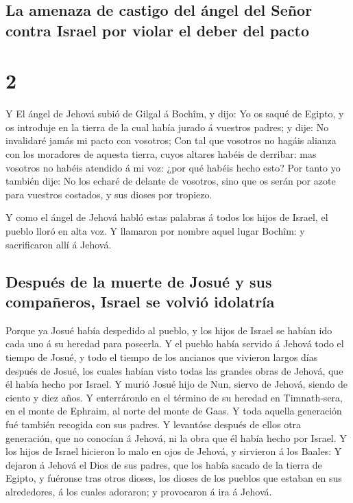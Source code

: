 \hypertarget{la-amenaza-de-castigo-del-uxe1ngel-del-seuxf1or-contra-israel-por-violar-el-deber-del-pacto}{%
\subsection{La amenaza de castigo del ángel del Señor contra Israel por
violar el deber del
pacto}\label{la-amenaza-de-castigo-del-uxe1ngel-del-seuxf1or-contra-israel-por-violar-el-deber-del-pacto}}

\hypertarget{section-1}{%
\section{2}\label{section-1}}

 Y El ángel de Jehová subió de Gilgal á Bochîm, y dijo: Yo
os saqué de Egipto, y os introduje en la tierra de la cual había jurado
á vuestros padres; y dije: No invalidaré jamás mi pacto con vosotros;
 Con tal que vosotros no hagáis alianza con los moradores
de aquesta tierra, cuyos altares habéis de derribar: mas vosotros no
habéis atendido á mi voz: ¿por qué habéis hecho esto?  Por
tanto yo también dije: No los echaré de delante de vosotros, sino que os
serán por azote para vuestros costados, y sus dioses por tropiezo.

 Y como el ángel de Jehová habló estas palabras á todos
los hijos de Israel, el pueblo lloró en alta voz.  Y
llamaron por nombre aquel lugar Bochîm: y sacrificaron allí á Jehová.

\hypertarget{despuuxe9s-de-la-muerte-de-josuuxe9-y-sus-compauxf1eros-israel-se-volviuxf3-idolatruxeda}{%
\subsection{Después de la muerte de Josué y sus compañeros, Israel se
volvió
idolatría}\label{despuuxe9s-de-la-muerte-de-josuuxe9-y-sus-compauxf1eros-israel-se-volviuxf3-idolatruxeda}}

 Porque ya Josué había despedido al pueblo, y los hijos de
Israel se habían ido cada uno á su heredad para poseerla. 
Y el pueblo había servido á Jehová todo el tiempo de Josué, y todo el
tiempo de los ancianos que vivieron largos días después de Josué, los
cuales habían visto todas las grandes obras de Jehová, que él había
hecho por Israel.  Y murió Josué hijo de Nun, siervo de
Jehová, siendo de ciento y diez años.  Y enterráronlo en
el término de su heredad en Timnath-sera, en el monte de Ephraim, al
norte del monte de Gaas.  Y toda aquella generación fué
también recogida con sus padres. Y levantóse después de ellos otra
generación, que no conocían á Jehová, ni la obra que él había hecho por
Israel.  Y los hijos de Israel hicieron lo malo en ojos
de Jehová, y sirvieron á los Baales:  Y dejaron á Jehová
el Dios de sus padres, que los había sacado de la tierra de Egipto, y
fuéronse tras otros dioses, los dioses de los pueblos que estaban en sus
alrededores, á los cuales adoraron; y provocaron á ira á Jehová.

